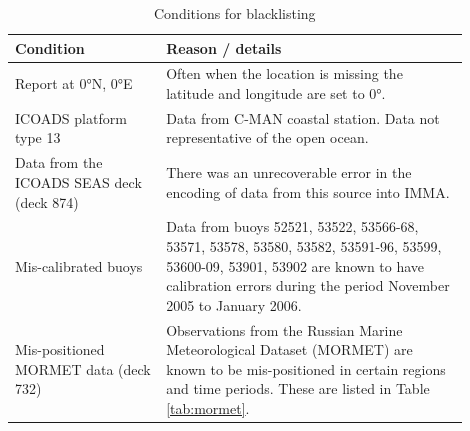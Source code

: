 {\begin{table}[h]
\centering
\caption{Conditions for blacklisting}
\label{tab:blacklist}
\begin{tabular}{|p{0.3\linewidth}|p{0.6\linewidth}|}
\hline
\bfseries Condition & \bfseries Reason / details \\
\hline
Report at 0°N, 0°E & Often when the location is missing the latitude and longitude are set to 0°.\\\hline
ICOADS platform type 13 & Data from C-MAN coastal station. Data not representative of the open ocean.\\\hline
Data from the ICOADS SEAS deck (deck 874)& There was an unrecoverable error in the encoding of data from this source into IMMA.\\\hline
Mis-calibrated buoys & Data from buoys 52521, 53522, 53566-68, 53571, 53578, 53580, 53582, 53591-96, 53599, 53600-09, 53901, 53902 are known to have calibration errors during the period November 2005 to January 2006.\\\hline
Mis-positioned MORMET data (deck 732) & Observations from the Russian Marine Meteorological Dataset (MORMET) are known to be mis-positioned in certain regions and time periods. These are listed in Table \ref{tab:mormet}.\\\hline
\end{tabular}
\end{table}

}
